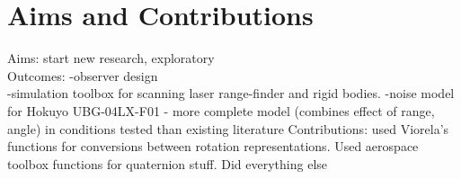 \chapter*{Aims and Contributions}

Aims: start new research, exploratory\\
Outcomes:
-observer design\\
-simulation toolbox for scanning laser range-finder and rigid bodies.
-noise model for Hokuyo UBG-04LX-F01 - more complete model (combines effect of range, angle) in conditions tested than existing literature
Contributions: used Viorela's functions for conversions between rotation representations. Used aerospace toolbox functions for quaternion stuff. Did everything else